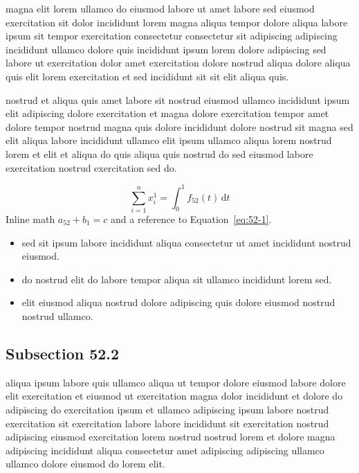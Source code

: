 \documentclass{article}
\begin{document}
magna elit lorem ullamco do eiusmod labore ut amet labore sed eiusmod exercitation sit dolor incididunt lorem magna aliqua tempor dolore aliqua labore ipsum sit tempor exercitation consectetur consectetur sit adipiscing adipiscing incididunt ullamco dolore quis incididunt ipsum lorem dolore adipiscing sed labore ut exercitation dolor amet exercitation dolore nostrud aliqua dolore aliqua quis elit lorem exercitation et sed incididunt sit sit elit aliqua quis.

nostrud et aliqua quis amet labore sit nostrud eiusmod ullamco incididunt ipsum elit adipiscing dolore exercitation et magna dolore exercitation tempor amet dolore tempor nostrud magna quis dolore incididunt dolore nostrud sit magna sed elit aliqua labore incididunt ullamco elit ipsum ullamco aliqua lorem nostrud lorem et elit et aliqua do quis aliqua quis nostrud do sed eiusmod labore exercitation nostrud exercitation sed do.

\begin{equation}\label{eq:52-1}
  \sum_{i=1}^{n} x_i^{1} = \int_0^1 f_{52}(t)\,\mathrm{d}t
\end{equation}
Inline math $a_{52} + b_{1} = c$ and a reference to Equation~\eqref{eq:52-1}.

\begin{itemize}
  \item sed sit ipsum labore incididunt aliqua consectetur ut amet incididunt nostrud eiusmod.
  \item do nostrud elit do labore tempor aliqua sit ullamco incididunt lorem sed.
  \item elit eiusmod aliqua nostrud dolore adipiscing quis dolore eiusmod nostrud nostrud ullamco.
\end{itemize}

\subsection{Subsection 52.2}\label{sec:52-2}
aliqua ipsum labore quis ullamco aliqua ut tempor dolore eiusmod labore dolore elit exercitation et eiusmod ut exercitation magna dolor incididunt et dolore do adipiscing do exercitation ipsum et ullamco adipiscing ipsum labore nostrud exercitation sit exercitation labore labore incididunt sit exercitation nostrud adipiscing eiusmod exercitation lorem nostrud nostrud lorem et dolore magna adipiscing incididunt aliqua consectetur amet adipiscing adipiscing ullamco ullamco dolore eiusmod do lorem elit.
\end{document}
